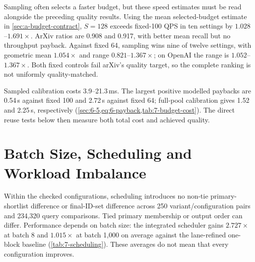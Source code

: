Sampling often selects a faster budget, but these speed estimates must
be read alongside the preceding quality results. Using the mean
selected-budget estimate in \cref{sec:a-budget-contract}, $S=128$ exceeds
fixed-100 QPS in ten settings by $1.028$--$1.691\times$. ArXiv ratios
are 0.908 and 0.917, with better mean recall but no throughput payback.
Against fixed 64, sampling wins nine of twelve settings, with geometric
mean $1.054\times$ and range $0.821$--$1.367\times$; on OpenAI the range
is $1.052$--$1.367\times$. Both fixed controls fail arXiv's quality
target, so the complete ranking is not uniformly quality-matched.

\begin{table}[!htbp]
\centering
\caption[Sampled-calibration economics]{Calibration economics, $S=128$. Rates are kQPS and rule rate is
mean selected-arm QPS. Ratios compare with fixed 100 and fixed 64.
The ``Batches'' column gives payback relative to fixed 100 using 500
queries, or 499 for Stella; ``Never'' denotes no throughput payback.
The quality column separately marks whether fixed 100 meets the
held-out loss target.}
\label{tab:7-budget-cost}
\footnotesize\setlength{\tabcolsep}{3pt}

\end{table}

Sampled calibration costs 3.9--21.3\,ms. The largest positive modelled
paybacks are 0.54\,s against fixed 100 and 2.72\,s against fixed 64;
full-pool calibration gives 1.52 and 2.25\,s, respectively
(\cref{sec:6-5,eq:6-payback,tab:7-budget-cost}). The direct reuse tests
below then measure both total cost and achieved quality.



\section{Batch Size, Scheduling and Workload Imbalance}
\label{sec:7-6}

Within the checked configurations, scheduling introduces no non-tie
primary-shortlist difference or final-ID-set difference across
250 variant/configuration pairs and 234,320 query comparisons. Tied
primary membership or output order can differ. Performance depends on
batch size: the integrated scheduler gains $2.727\times$ at batch 8 and
$1.015\times$ at batch 1,000 on average against the lane-refined
one-block baseline (\cref{tab:7-scheduling}). These averages do not
mean that every configuration improves.

